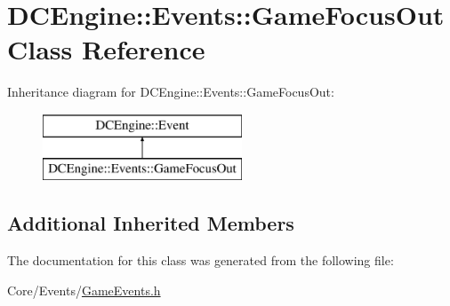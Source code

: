 \hypertarget{classDCEngine_1_1Events_1_1GameFocusOut}{\section{D\-C\-Engine\-:\-:Events\-:\-:Game\-Focus\-Out Class Reference}
\label{classDCEngine_1_1Events_1_1GameFocusOut}
}
Inheritance diagram for D\-C\-Engine\-:\-:Events\-:\-:Game\-Focus\-Out\-:\begin{figure}[H]
\begin{center}
\leavevmode
\includegraphics[height=2.000000cm]{classDCEngine_1_1Events_1_1GameFocusOut}
\end{center}
\end{figure}
\subsection*{Additional Inherited Members}


The documentation for this class was generated from the following file\-:\begin{DoxyCompactItemize}
\item 
Core/\-Events/\hyperlink{GameEvents_8h}{Game\-Events.\-h}\end{DoxyCompactItemize}
